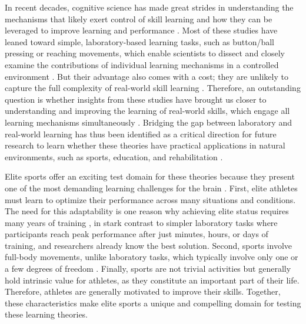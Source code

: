 In recent decades, cognitive science has made great strides in understanding the mechanisms that likely exert control of skill learning and how they can be leveraged to improve learning and performance \cite{wolpert_principles_2011, makino_circuit_2016, spampinato_multiple_2021, krakauer_motor_2019, haith_model-based_2013, huang_rethinking_2011, shmuelof_are_2011, doya_complementary_2000}. Most of these studies have leaned toward simple, laboratory-based learning tasks\cite{krakauer_motor_2019, du_relationship_2022}, such as button/ball pressing \cite{hardwick_time-dependent_2019, vassiliadis_reward_2021} or reaching movements\cite{shadmehr_adaptive_1994, krakauer_learning_2000},  which enable scientists to dissect and closely examine the contributions of individual learning mechanisms in a controlled environment \cite{spampinato_multiple_2021}. But their advantage also comes with a cost; they are unlikely to capture the full complexity of real-world skill learning \cite{krakauer_motor_2019, mangalam_investigating_2023, du_relationship_2022, chen_effects_2018, wolpert_principles_2011, gallivan_decision-making_2018, iyer_probing_2020, ingram_naturalistic_2011}. Therefore, an outstanding question is whether insights from these studies have brought us closer to understanding and improving the learning of real-world skills, which engage all learning mechanisms simultaneously \cite{spampinato_multiple_2021}. Bridging the gap between laboratory and real-world learning has thus been identified as a critical direction for future research to learn whether these theories have practical applications in natural environments, such as sports, education, and rehabilitation \cite{du_relationship_2022, wolpert_motor_2010, yarrow_inside_2009, haar_motor_2020, ingram_naturalistic_2011}.

Elite sports offer an exciting test domain for these theories because they present one of the most demanding learning challenges for the brain \cite{walsh_is_2014}. First, elite athletes must learn to optimize their performance across many situations and conditions\cite{mangalam_investigating_2023, du_relationship_2022, krakauer_motor_2019}. The need for this adaptability is one reason why achieving elite status requires many years of training \cite{krakauer_motor_2019}, in stark contrast to simpler laboratory tasks where participants reach peak performance after just minutes, hours, or days of training, and researchers already know the best solution. Second, sports involve full-body movements, unlike laboratory tasks, which typically involve only one or a few degrees of freedom \cite{du_relationship_2022}. Finally, sports are not trivial activities but generally hold intrinsic value for athletes, as they constitute an important part of their life. Therefore, athletes are generally motivated to improve their skills. Together, these characteristics make elite sports a unique and compelling domain for testing these learning theories.

